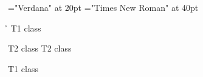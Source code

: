\font\tbta="Verdana" at 20pt
\font\ta="Times New Roman" at 40pt
 \r\n
\ta T1 class 

\tbta T2 class T2 class 

\ta T1 class 


\bye
